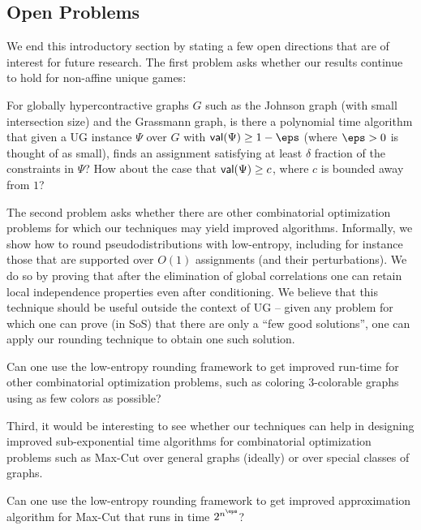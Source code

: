 \subsection{Open Problems}
We end this introductory section by stating a few open
directions that are of interest for future research.
The first problem asks whether our results continue to 
hold for non-affine unique games:
\begin{problem}
For globally hypercontractive graphs $G$ 
such as the Johnson graph 
(with small intersection size) and the Grassmann graph, is there
a polynomial time algorithm that given a UG instance 
$\Psi$ over $G$ with ${\sf val}(\Psi)\geq 1-\eps$ (where $\eps>0$ is thought of as small), finds 
an assignment satisfying at least $\delta$ fraction of the
constraints in $\Psi$? How about the case that ${\sf val}(\Psi)\geq c$, where $c$ is bounded away from $1$?
\end{problem}

The second problem asks whether there are other combinatorial optimization problems for which our techniques may yield improved algorithms. Informally, we show how to round pseudodistributions with low-entropy, including for instance those that are supported over $O(1)$ assignments (and their perturbations). We do so by proving that after the
elimination of global correlations one can retain local independence properties even after conditioning. We believe that this technique should be useful outside the context of UG -- given any problem for which one can prove (in SoS) that there are only a ``few good solutions'', one can apply our rounding technique to obtain one such solution.

\begin{problem}
Can one use the low-entropy rounding framework to get improved run-time for other combinatorial optimization problems, such as coloring $3$-colorable graphs using as few colors as possible?
\end{problem}

Third, it would be interesting to see whether our techniques 
can help in designing improved sub-exponential time algorithms
for combinatorial optimization problems such as Max-Cut over general graphs (ideally) or over special classes of graphs.
\begin{problem}
Can one use the low-entropy rounding framework to get improved approximation algorithm for Max-Cut that runs in time $2^{n^{\eps}}$? 
\end{problem}






